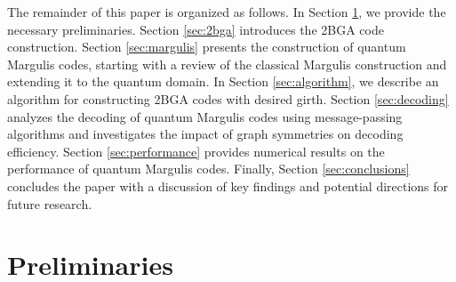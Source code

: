 \documentclass[a4paper,twocolumn,11pt,accepted=2026-05-03]{quantumarticle}
\begin{document}
The remainder of this paper is organized as follows. In Section \ref{sec:premilinaries}, we provide the necessary preliminaries. Section \ref{sec:2bga} introduces the 2BGA code construction. Section \ref{sec:margulis} presents the construction of quantum Margulis codes, starting with a review of the classical Margulis construction and extending it to the quantum domain. In Section \ref{sec:algorithm}, we describe an algorithm for constructing 2BGA codes with desired girth. Section \ref{sec:decoding} analyzes the decoding of quantum Margulis codes using message-passing algorithms and investigates the impact of graph symmetries on decoding efficiency. Section \ref{sec:performance} provides numerical results on the performance of quantum Margulis codes. Finally, Section \ref{sec:conclusions} concludes the paper with a discussion of key findings and potential directions for future research.



\section{Preliminaries}
\label{sec:premilinaries}
\end{document}
